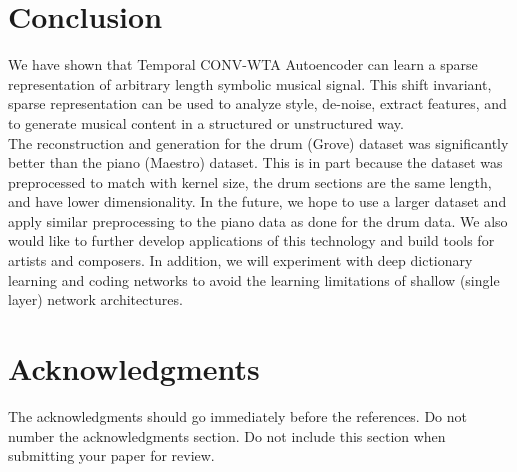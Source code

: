 \documentclass[11pt,a4paper]{article}
\begin{document}
\section{Conclusion}

%
%


We have shown that Temporal CONV-WTA Autoencoder can learn a sparse representation of arbitrary length symbolic musical signal. This shift invariant, sparse representation can be used to analyze style, de-noise, extract features, and to generate musical content in a structured or unstructured way. \\
The reconstruction and generation for the drum (Grove) dataset was significantly better than the piano (Maestro) dataset. This is in part because the dataset was preprocessed to match with kernel size, the drum sections are the same length, and have lower dimensionality. 
In the future, we hope to use a larger dataset and apply similar preprocessing to the piano data as done for the drum data. We also would like to further develop applications of this technology and build tools for artists and composers. In addition, we will experiment with deep dictionary learning and coding networks \cite{tang2020dictionary} to avoid the learning limitations of shallow (single layer) network architectures.

\section*{Acknowledgments}

The acknowledgments should go immediately before the references.  Do
not number the acknowledgments section. Do not include this section
when submitting your paper for review. \\
\end{document}
